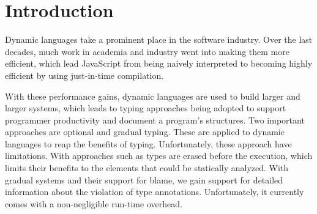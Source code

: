 
\section{Introduction}
\label{sec:introduction}

%
%

Dynamic languages take a prominent place in the software industry.
Over the last decades, much work in academia and industry
went into making them more efficient\citep{Self,Bolz2013,Bolz:2013:IMT,Wurthinger:2017:PPE,Daloze2016,Clifford:2015:MM,Degenbaev:2016:ITG},
which lead JavaScript from being naively interpreted
to becoming highly efficient by using just-in-time compilation.



With these performance gains,
dynamic languages are used to build larger and larger systems,
which leads to typing approaches being adopted
to support programmer productivity and document a program's structures.
Two important approaches are optional\citep{Bracha:04:PT}
and gradual typing\citep{Siek2006,Siek2015}.
These are applied to dynamic languages to reap the benefits of typing.
Unfortunately, these approach have limitations.
With approaches such as 
types are erased before the execution,
which limits their benefits to the elements that could be statically analyzed.
With gradual systems and their support for blame,
we gain support for detailed information
about the violation of type annotations.
Unfortunately, it currently comes with a non-negligible run-time overhead\citep{Takikawa2016,Vitousek2017,Muehlboeck2017,Bauman2017,Richards2017,Stulova2016,Greenman2018}.

